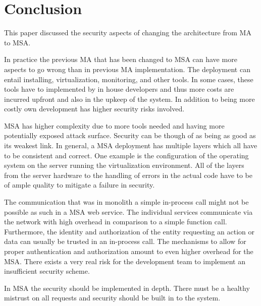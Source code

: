 \section{Conclusion}
\begin{sloppypar}
    This paper discussed the security aspects of changing the architecture from
    MA to MSA.
\end{sloppypar}
\begin{sloppypar}
    In practice the previous MA that has been changed to MSA can have more
    aspects to go wrong than in previous MA implementation. The deployment can
    entail installing, virtualization, monitoring, and other tools. In some
    cases, these tools have to implemented by in house developers and thus more
    costs are incurred upfront and also in the upkeep of the system. In addition
    to being more costly own development has higher security risks involved.
\end{sloppypar}
\begin{sloppypar}
    MSA has higher complexity due to more tools needed and having more
    potentially exposed attack surface. Security can be though of as being as
    good as its weakest link. In general, a MSA deployment has multiple layers
    which all have to be consistent and correct. One example is the
    configuration of the operating system on the server running the
    virtualization environment. All of the layers from the server hardware to
    the handling of errors in the actual code have to be of ample quality to
    mitigate a failure in security.
\end{sloppypar}
\begin{sloppypar}
    The communication that was in monolith a simple in-process call might not be
    possible as such in a MSA web service. The individual services communicate
    via the network with high overhead in comparison to a simple function call.
    Furthermore, the identity and authorization of the entity requesting an
    action or data can usually be trusted in an in-process call. The mechanisms
    to allow for proper authentication and authorization amount to even higher
    overhead for the MSA. There exists a very real risk for the development team
    to implement an insufficient security scheme.
\end{sloppypar}
\begin{sloppypar}
    In MSA the security should be implemented in depth. There must be a healthy
    mistrust on all requests and security should be built in to the system.
\end{sloppypar}

